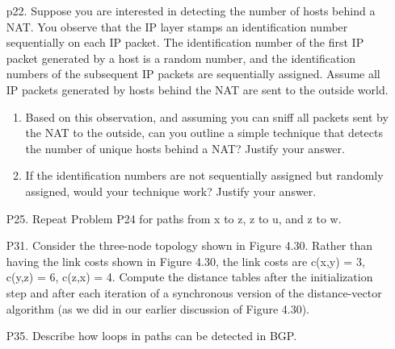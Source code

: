 \begin{enumerate}
    \item[p22.] Suppose you are interested in detecting the number of hosts behind a NAT. You observe that the IP layer stamps an identification number sequentially on each IP packet. The identification number of the first IP packet generated by a host is a random number, and the identification numbers of the subsequent IP packets are sequentially assigned. Assume all IP packets generated by hosts behind the NAT are sent to the outside world.
    \begin{enumerate}
        \item Based on this observation, and assuming you can sniff all packets sent by the NAT to the outside, can you outline a simple technique that detects the number of unique hosts behind a NAT? Justify your answer.
        \item If the identification numbers are not sequentially assigned but randomly assigned, would your technique work? Justify your answer.
    \end{enumerate}
    \item[P25.] Repeat Problem P24 for paths from x to z, z to u, and z to w.

    \item[P31.] Consider the three-node topology shown in Figure 4.30. Rather than having the link costs shown in Figure 4.30, the link costs are c(x,y) = 3, c(y,z) = 6, c(z,x) = 4. Compute the distance tables after the initialization step and after each iteration of a synchronous version of the distance-vector algorithm (as we did in our earlier discussion of Figure 4.30).
    \item[P35.] Describe how loops in paths can be detected in BGP.
\end{enumerate}

